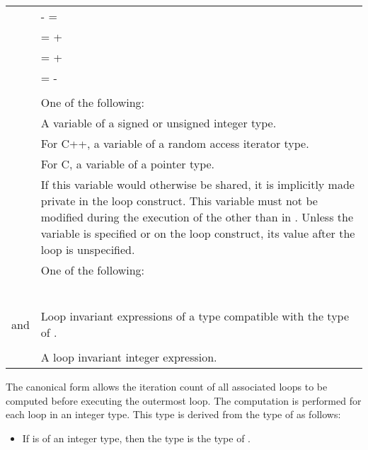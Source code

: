 \begin{ccppspecific}
\begin{supertabular}{ p{0.8in} p{4.5in}}
    & {} {-} = {}\\
    & {} = {} + {}\\
    & {} = {} + {}\\
    & {} = {} - {}\\
    & \\
    {} & One of the following:\\
    & \hspace{1.5em}A variable of a signed or unsigned integer type.\\
    & \hspace{1.5em}For C++, a variable of a random access iterator type.\\
    & \hspace{1.5em}For C, a variable of a pointer type.\\
    & If this variable would otherwise be shared, it is implicitly made private in the loop
    construct. This variable must not be modified during the execution of the {}
    other than in {}. Unless the variable is specified {}
    or {} on the loop construct, its value after the loop is unspecified.\\
    {} & One of the following:\\
    & {\scode{<}}\\
    & {\scode{<=}}\\
    & {\scode{>}}\\
    & {\scode{>=}}\\
    & {\scode{!=}}\\
    & \\
    {} and {} & Loop invariant expressions of a type compatible with the type of {}.\\
    & \\
    {} & A loop invariant integer expression.\\
\end{supertabular}
\medskip

\linenumbers

The canonical form allows the iteration count of all associated loops to be computed
before executing the outermost loop. The computation is performed for each loop in an
integer type. This type is derived from the type of  as follows:

\begin{itemize}
    \item If  is of an integer type, then the type is the type of .


\end{itemize}
\end{ccppspecific}
